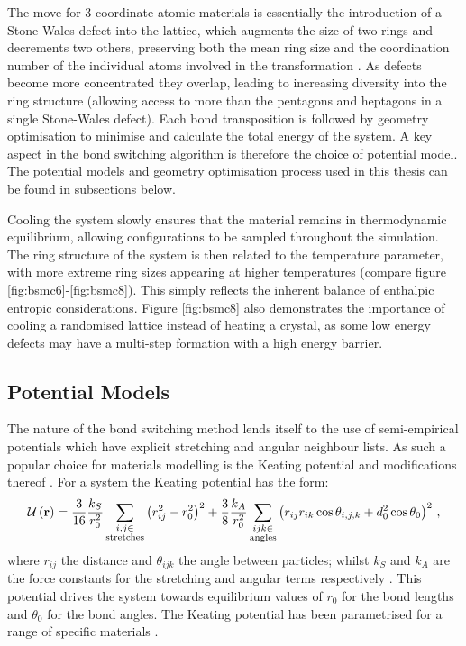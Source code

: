 The \mc{} move for 3\--coordinate atomic materials is essentially the introduction of a Stone\--Wales defect into the lattice, which
augments the size of two rings and decrements two others, preserving both the mean ring size and the coordination number of the individual atoms involved in the transformation \cite{Stone1986}.
As defects become more concentrated they overlap, leading to increasing diversity into the ring structure (allowing access to more than the pentagons and heptagons in a single Stone\--Wales defect).
Each bond transposition is followed by geometry optimisation to minimise and calculate the total energy of the system.  
A key aspect in the bond switching algorithm is therefore the choice of potential model.
The potential models and geometry optimisation process used in this thesis can be found in subsections below.

Cooling the system slowly ensures that the material remains in thermodynamic equilibrium, allowing configurations to be sampled throughout the simulation.
The ring structure of the system is then related to the temperature parameter, with more extreme ring sizes appearing at higher temperatures (compare figure \ref{fig:bsmc6}\--\ref{fig:bsmc8}).
This simply reflects the inherent balance of enthalpic \vs{} entropic  considerations.
Figure \ref{fig:bsmc8} also demonstrates the importance of cooling a randomised lattice instead of heating a crystal, as some low energy defects may have a multi\--step formation with a high energy barrier.  

\subsection{Potential Models}

The nature of the bond switching method lends itself to the use of semi\--empirical potentials which have explicit stretching and angular neighbour lists.
As such a popular choice for materials modelling is the Keating potential and modifications thereof \cite{Keating1966,Barkema2000}. 
For a \td{} system the Keating potential has the form:
\begin{equation}
	\mathcal{U}\left(\mathbf{r}\right) = \frac{3}{16}\frac{k_S}{r_0^2}\sum_{\substack{i,j \in \\ \text{stretches}}} \left(r_{ij}^2-r_0^2\right)^2+
	\frac{3}{8}\frac{k_A}{r_0^2}\sum_{\substack{ijk \in \\ \text{angles}}}\left(r_{ij}r_{ik}\cos\theta_{i,j,k}+d_0^2\cos\theta_0\right)^2 \,,
\end{equation}
where $r_{ij}$ the distance and $\theta_{ijk}$ the angle between particles; whilst $k_S$ and $k_A$ are the force constants for the stretching and angular terms respectively \cite{Kumar2012}.
This potential drives the system towards equilibrium values of $r_0$ for the bond lengths and $\theta_0$ for the bond angles.
The Keating potential has been parametrised for a range of specific materials \cite{Kumar2012,Drabold2009}. 

